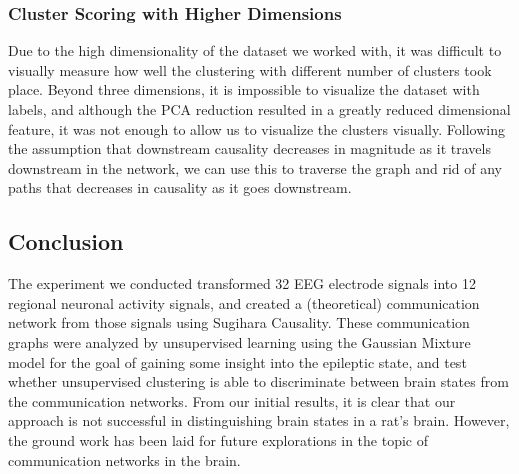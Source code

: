 \subsubsection{Cluster Scoring with Higher Dimensions}
Due to the high dimensionality of the dataset we worked with, it was difficult to visually measure how well the clustering with different number of clusters took place. Beyond three dimensions, it is impossible to visualize the dataset with labels, and although the PCA reduction resulted in a greatly reduced dimensional feature, it was not enough to allow us to visualize the clusters visually.
Following the assumption that downstream causality decreases in magnitude as it travels downstream in the network, we can use this to traverse the graph and rid of any paths that decreases in causality as it goes downstream.

\subsection{Conclusion}
The experiment we conducted transformed 32 EEG electrode signals into 12 regional neuronal activity signals, and created a (theoretical) communication network from those signals using Sugihara Causality. These communication graphs were analyzed by unsupervised learning using the Gaussian Mixture model for the goal of gaining some insight into the epileptic state, and test whether unsupervised clustering is able to discriminate between brain states from the communication networks. From our initial results, it is clear that our approach is not successful in distinguishing brain states in a rat's brain. However, the ground work has been laid for future explorations in the topic of communication networks in the brain. 
